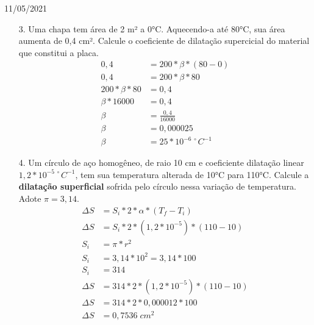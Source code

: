 \documentclass{SchoolBook}
\begin{document}
    \begin{day}{11/05/2021}
        \begin{enumerate}
            \item[3.] Uma chapa tem área de 2 m² a 0°C. Aquecendo-a até 80°C, sua área aumenta de 0,4 cm². Calcule o coeficiente de dilatação supercicial do material que constitui a placa.
            \begin{align*}
                              0,4 &= 200 * \beta * (80 - 0)  \\
                              0,4 &= 200 * \beta * 80        \\
                 200 * \beta * 80 &= 0,4                     \\
                    \beta * 16000 &= 0,4                     \\
                            \beta &= \frac{0,4}{16000}       \\
                            \beta &= 0,000025                \\
                            \beta &= 25 * 10^{-6\;\circ}C^{-1}
            \end{align*}
            
            \item[4.] Um círculo de aço homogêneo, de raio 10 cm e coeficiente dilatação linear $1,2 * 10^{-5\;\circ}C^{-1}$, tem sua temperatura alterada de 10°C para 110°C. Calcule a \textbf{dilatação superficial} sofrida pelo círculo nessa variação de temperatura. Adote $\pi = 3,14$.
            \begin{align*}
                \Delta S &= S_i * 2 * \alpha * (T_f - T_i)         \\[3pt]
                \Delta S &= S_i * 2 * (1,2 * 10^{-5}) * (110 - 10) \\[3pt]
                     S_i &= \pi * r^2                              \\
                     S_i &= 3,14 * 10^2 = 3,14 * 100               \\
                     S_i &= 314                                    \\[3pt]
                \Delta S &= 314 * 2 * (1,2 * 10^{-5}) * (110 - 10) \\
                \Delta S &= 314 * 2 * 0,000012 * 100               \\
                \Delta S &= 0,7536\;cm^2
            \end{align*}
        \end{enumerate}
    \end{day}
    
\end{document}
